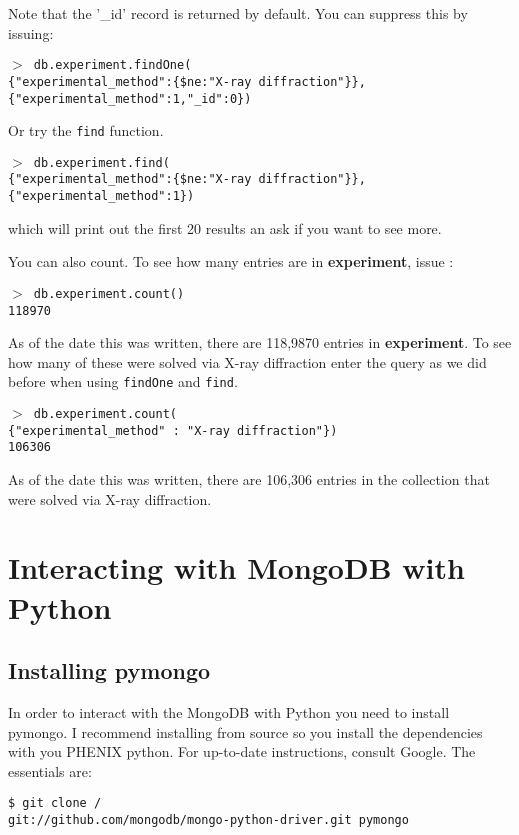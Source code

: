 \documentclass[12pt]{article}
\newcommand{\mdbcmdline}[1]{\vspace{5mm} \noindent
\texttt{$>$ #1}
\vspace{5mm}

}
\newcommand{\mdbcol}[1]{{\color{Bittersweet}\textbf{#1}}}
\begin{document}
\noindent
Note that the '\_id' record is returned by default.
You can suppress this by issuing:

\mdbcmdline{db.experiment.findOne(\\
\{"experimental\_method":\{\$ne:"X-ray diffraction"\}\}, \\
\{"experimental\_method":1,"\_id":0\})
}
\noindent

Or try the \texttt{find} function.

\mdbcmdline{db.experiment.find(\\
\{"experimental\_method":\{\$ne:"X-ray diffraction"\}\}, \\
\{"experimental\_method":1\})
}

\noindent
which will print out the first 20 results an ask if you want to see more.

\vspace{5mm}
\noindent
You can also count.
To see how many entries are in \mdbcol{experiment}, issue :

\mdbcmdline{db.experiment.count() \\
118970}

\noindent
As of the date this was written, there are 118,9870 entries in \mdbcol{experiment}.
To see how many of these were solved via X-ray diffraction enter the query as we did before when using \texttt{findOne} and \texttt{find}.

\mdbcmdline{db.experiment.count(\\
\{"experimental\_method" : "X-ray diffraction"\}) \\
106306}

\noindent
As of the date this was written, there are 106,306 entries in the collection that were solved via X-ray diffraction.


\section{Interacting with MongoDB with Python}
\subsection{Installing pymongo}
In order to interact with the MongoDB with Python you need to install pymongo.
I recommend installing from source so you install the dependencies with you PHENIX python.
For up-to-date instructions, consult Google.
The essentials are:

\vspace{5mm}
\noindent
\texttt{\$ git clone / \\
\indent
git://github.com/mongodb/mongo-python-driver.git pymongo}
\end{document}
